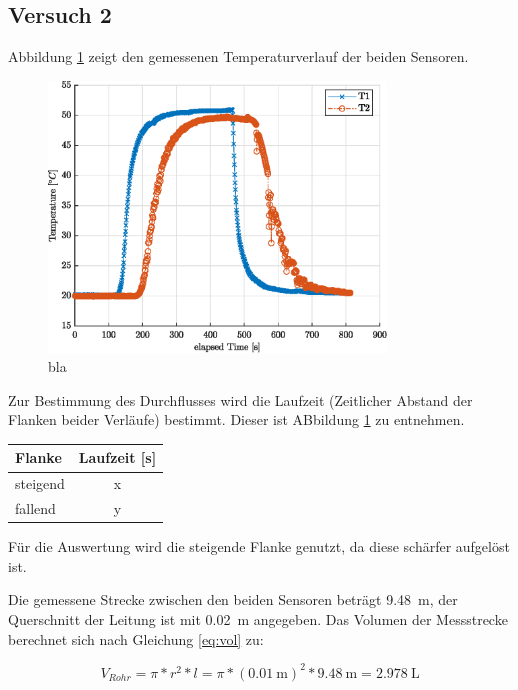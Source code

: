 \subsection{Versuch 2}


Abbildung \ref{fig:temp} zeigt den gemessenen Temperaturverlauf der beiden Sensoren.
\begin{figure}[H]
	\centering
	\includegraphics[width=0.8\textwidth]{../DATA/tempPlot.eps}
	\caption[bla]{bla}
	\label{fig:temp}
\end{figure}

Zur Bestimmung des Durchflusses wird  die Laufzeit (Zeitlicher Abstand der Flanken beider Verläufe) bestimmt. Dieser ist ABbildung \ref{fig:temp} zu entnehmen.

\begin{center}
	\begin{tabular}{l|c}
		\label{tab:}
		
		\textbf{Flanke} & \textbf{Laufzeit} [s]\\
		\hline
		steigend & x \\
		fallend & y \\
	\end{tabular}
\end{center}
Für die Auswertung wird die steigende Flanke genutzt, da diese schärfer aufgelöst ist.

Die gemessene Strecke zwischen den beiden Sensoren beträgt \SI{9,48}{\meter}, der Querschnitt der Leitung ist mit \SI{0,02}{\meter} angegeben. Das Volumen der Messstrecke berechnet sich nach Gleichung \ref{eq:vol} zu:

\begin{equation}
	\label{eq:vol}
	V_{Rohr} = \pi * r^2 * l = \pi * (\SI{0,01}{\meter})^2 * \SI{9,48}{\meter} = \SI{2,978}{\liter}
\end{equation}

